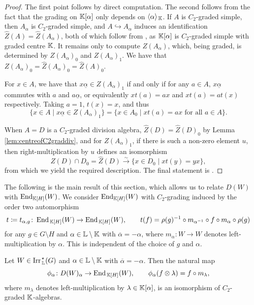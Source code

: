 \begin{proof}
    The first point follows by direct computation. The second follows from the fact that the grading on ${\mathbb K}[\alpha]$ only depends on $\langle \alpha \rangle_{\, {\mathbb K}}$. If $A$ is $C_2$-graded simple, then $A_{\alpha}$ is $C_2$-graded simple, and $A \hookrightarrow A_{\alpha}$ induces an identification $\widehat{Z}(A) = \widehat{Z}(A_{\alpha})$, both of which follow from \cite[Thm.\ IV.2.3]{LAM}, as ${\mathbb K}[\alpha]$ is $C_2$-graded simple with graded centre ${\mathbb K}$. It remains only to compute $Z(A_{\alpha})$, which, being graded, is determined by $Z(A_{\alpha})_0$ and $Z(A_{\alpha})_1$. We have that $Z(A_{\alpha})_0 = \widehat{Z}(A_{\alpha})_0 = \widehat{Z}(A)_0$.

    For $x \in A$, we have that $x \underline{\alpha} \in Z(A_{\alpha})_1$ if and only if for any $a \in A$, $x \underline{\alpha}$ commutes with $a$ and $a \underline{\alpha}$, or equivalently $x t(a) = ax$ and $x t(a) = a t(x)$ respectively. Taking $a = 1$, $t(x) = x$, and thus
    \[
    \{ x \in A \mid  x \underline{\alpha} \in Z(A_{\alpha})_1 \} = \{x \in A_0 \mid x t(a) = ax \text{ for all } a \in A\}.
    \]

    When $A = D$ is a $C_2$-graded division algebra, $\widehat{Z}(D) = \widehat{Z}(D)_0$ by Lemma \ref{lem:centreofC2graddiv}, and for $Z(A_{\alpha})_1$, if there is such a non-zero element $u$, then right-multiplication by $u$ defines an isomorphism
    \[
    Z(D) \cap D_0 = \widehat{Z}(D) \xrightarrow{\sim} \{x \in D_0 \mid x t(y) = yx\},
    \]
    from which we yield the required description. The final statement is \cite[Thm.\ IV.3.4]{LAM}.
\end{proof}

The following is the main result of this section, which allows us to relate $D(W)$ with $\operatorname{End}_{{\mathbb K}[H]}(W)$. We consider $\operatorname{End}_{{\mathbb K}[H]}(W)$ with $C_2$-grading induced by the order two automorphism
\[
t \coloneqq t_{\alpha,g} \colon \operatorname{End}_{\, {\mathbb K}[H]}(W) \rightarrow \operatorname{End}_{\, {\mathbb K}[H]}(W), \qquad t(f) = \rho(g)^{-1} \circ m_{\alpha^{-1}} \circ f \circ m_{\alpha} \circ \rho(g)
\]
for any $g \in G \setminus H$ and $\alpha \in {\mathbb L} \setminus {\mathbb K}$ with $\overline{\alpha} = - \alpha$, where $m_{\alpha} \colon W \rightarrow W$ denotes left-multiplication by $\alpha$. This is independent of the choice of $g$ and $\alpha$.

\begin{prop}\label{prop:recoverKHendo}
    Let $W \in \operatorname{Irr}_{\, {\mathbb L}}^{\hspace{0.1em} \star}(G)$ and $\alpha \in {\mathbb L} \setminus {\mathbb K}$ with $\overline{\alpha} = - \alpha$. Then the natural map
    \[
    \phi_{\alpha} \colon D(W)_{\alpha} \rightarrow \operatorname{End}_{\, {\mathbb K}[H]}(W), \qquad \phi_{\alpha}(f \otimes \lambda) = f \circ m_{\lambda},
    \]
    where $m_{\lambda}$ denotes left-multiplication by $\lambda \in {\mathbb K}[\alpha]$, is an isomorphism of $C_2$-graded ${\mathbb K}$-algebras.
\end{prop}

